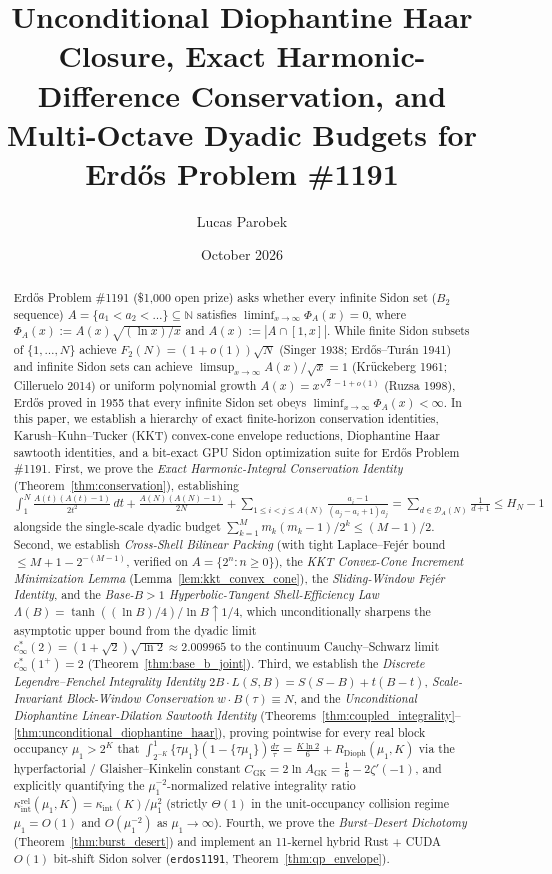 \documentclass[11pt,reqno]{amsart}
\title[Unconditional Diophantine Haar Closure for Erd\H{o}s Problem \#1191]{Unconditional Diophantine Haar Closure, Exact Harmonic-Difference Conservation, and Multi-Octave Dyadic Budgets for Erd\H{o}s Problem \#1191}
\author{Lucas Parobek}
\date{October 2026}
\theoremstyle{definition}
\theoremstyle{remark}
\begin{document}
\begin{abstract}
Erd\H{o}s Problem \#1191 (\$1,000 open prize) asks whether every infinite Sidon set ($B_2$ sequence) $A = \{a_1 < a_2 < \dots\} \subseteq \mathbb{N}$ satisfies $\liminf_{x \to \infty} \Phi_A(x) = 0$, where $\Phi_A(x) := A(x)\sqrt{(\ln x)/x}$ and $A(x) := |A \cap [1, x]|$. While finite Sidon subsets of $\{1, \dots, N\}$ achieve $F_2(N) = (1 + o(1))\sqrt{N}$ (Singer 1938; Erd\H{o}s--Tur\'an 1941) and infinite Sidon sets can achieve $\limsup_{x\to\infty} A(x)/\sqrt{x} = 1$ (Kr\"uckeberg 1961; Cilleruelo 2014) or uniform polynomial growth $A(x) = x^{\sqrt{2}-1+o(1)}$ (Ruzsa 1998), Erd\H{o}s proved in 1955 that every infinite Sidon set obeys $\liminf_{x\to\infty} \Phi_A(x) < \infty$. In this paper, we establish a hierarchy of exact finite-horizon conservation identities, Karush--Kuhn--Tucker (KKT) convex-cone envelope reductions, Diophantine Haar sawtooth identities, and a bit-exact GPU Sidon optimization suite for Erd\H{o}s Problem \#1191. First, we prove the \emph{Exact Harmonic-Integral Conservation Identity} (Theorem~\ref{thm:conservation}), establishing $\int_1^N \frac{A(t)(A(t)-1)}{2t^2}\,dt + \frac{A(N)(A(N)-1)}{2N} + \sum_{1 \le i < j \le A(N)} \frac{a_i - 1}{(a_j - a_i + 1)a_j} = \sum_{d \in \mathcal{D}_A(N)} \frac{1}{d+1} \le H_N - 1$ alongside the single-scale dyadic budget $\sum_{k=1}^M m_k(m_k-1)/2^k \le (M-1)/2$. Second, we establish \emph{Cross-Shell Bilinear Packing} (with tight Laplace--Fej\'er bound $\le M + 1 - 2^{-(M-1)}$, verified on $A = \{2^n : n \ge 0\}$), the \emph{KKT Convex-Cone Increment Minimization Lemma} (Lemma~\ref{lem:kkt_convex_cone}), the \emph{Sliding-Window Fej\'er Identity}, and the \emph{Base-$B > 1$ Hyperbolic-Tangent Shell-Efficiency Law} $\Lambda(B) = \tanh((\ln B)/4)/\ln B \uparrow 1/4$, which unconditionally sharpens the asymptotic upper bound from the dyadic limit $c_\infty^*(2) = (1+\sqrt{2})\sqrt{\ln 2} \approx 2.009965$ to the continuum Cauchy--Schwarz limit $c_\infty^*(1^+) = 2$ (Theorem~\ref{thm:base_b_joint}). Third, we establish the \emph{Discrete Legendre--Fenchel Integrality Identity} $2B\cdot L(S, B) = S(S-B) + t(B-t)$, \emph{Scale-Invariant Block-Window Conservation} $w \cdot B(\tau) \equiv N$, and the \emph{Unconditional Diophantine Linear-Dilation Sawtooth Identity} (Theorems~\ref{thm:coupled_integrality}--\ref{thm:unconditional_diophantine_haar}), proving pointwise for every real block occupancy $\mu_1 > 2^K$ that $\int_{2^{-K}}^1 \{\tau \mu_1\}(1 - \{\tau \mu_1\})\frac{d\tau}{\tau} = \frac{K\ln 2}{6} + R_{\mathrm{Dioph}}(\mu_1, K)$ via the hyperfactorial / Glaisher--Kinkelin constant $C_{\mathrm{GK}} = 2\ln A_{\mathrm{GK}} = \frac{1}{6} - 2\zeta'(-1)$, and explicitly quantifying the $\mu_1^{-2}$-normalized relative integrality ratio $\kappa_{\mathrm{int}}^{\mathrm{rel}}(\mu_1, K) = \kappa_{\mathrm{int}}(K)/\mu_1^2$ (strictly $\Theta(1)$ in the unit-occupancy collision regime $\mu_1 = O(1)$ and $O(\mu_1^{-2})$ as $\mu_1 \to \infty$). Fourth, we prove the \emph{Burst--Desert Dichotomy} (Theorem~\ref{thm:burst_desert}) and implement an 11-kernel hybrid Rust + CUDA $O(1)$ bit-shift Sidon solver (\texttt{erdos1191}, Theorem~\ref{thm:qp_envelope}).
\end{abstract}
\end{document}
